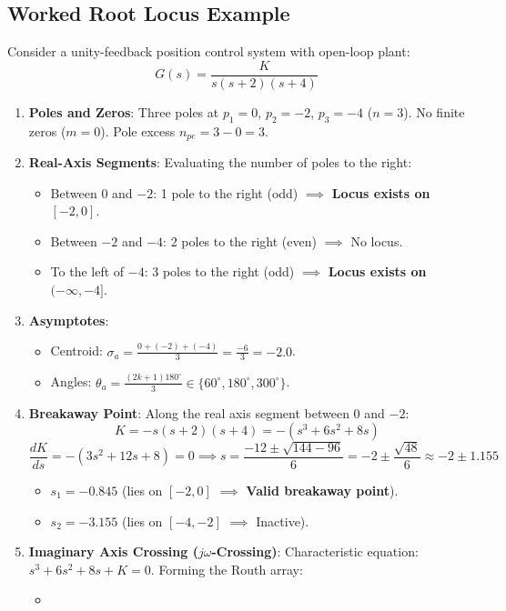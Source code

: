 \documentclass[12pt,onecolumn,twoside ]{article}
\begin{document}
	\subsection{Worked Root Locus Example}
	Consider a unity-feedback position control system with open-loop plant: \[
	G(s) = \frac{K}{s(s + 2)(s + 4)}
	\]
	\begin{enumerate}
		\item
		\textbf{Poles and Zeros}: Three poles at $p_1 = 0$, $p_2 = -2$, $p_3 = -4$ ($n = 3$). No finite zeros ($m = 0$). Pole excess $n_{pe} = 3 - 0 = 3$.
		\item
		\textbf{Real-Axis Segments}: Evaluating the number of poles to the right:
		\begin{itemize}
			\item
			Between $0$ and $-2$: 1 pole to the right (odd) $\implies$ \textbf{Locus exists on $[-2, 0]$}.
			\item
			Between $-2$ and $-4$: 2 poles to the right (even) $\implies$ No locus.
			\item
			To the left of $-4$: 3 poles to the right (odd) $\implies$ \textbf{Locus exists on $(-\infty, -4]$}.
		\end{itemize}
		\item
		\textbf{Asymptotes}:
		\begin{itemize}
			\item
			Centroid: $\sigma_a = \frac{0 + (-2) + (-4)}{3} = \frac{-6}{3} = -2.0$.
			\item
			Angles: $\theta_a = \frac{(2k + 1)180^\circ}{3} \in \{60^\circ, 180^\circ, 300^\circ\}$.
		\end{itemize}
		\item
		\textbf{Breakaway Point}: Along the real axis segment between $0$ and $-2$: \[
		K = -s(s + 2)(s + 4) = -(s^3 + 6s^2 + 8s)
		\] \[
		\frac{dK}{ds} = -(3s^2 + 12s + 8) = 0 \implies s = \frac{-12 \pm \sqrt{144 - 96}}{6} = -2 \pm \frac{\sqrt{48}}{6} \approx -2 \pm 1.155
		\]
		\begin{itemize}
			\item
			$s_1 = -0.845$ (lies on $[-2, 0]$ $\implies$ \textbf{Valid breakaway point}).
			\item
			$s_2 = -3.155$ (lies on $[-4, -2]$ $\implies$ Inactive).
		\end{itemize}
		\item
		\textbf{Imaginary Axis Crossing ($j\omega$-Crossing)}: Characteristic equation: $s^3 + 6s^2 + 8s + K = 0$. Forming the Routh array:
		\begin{itemize}
			\item

\end{itemize}
\end{enumerate}
\end{document}
